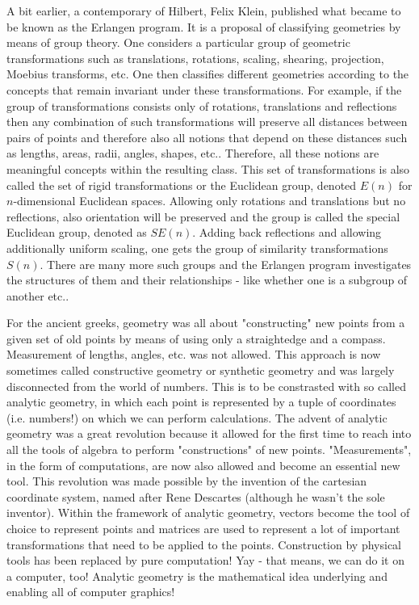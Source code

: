 \medskip
A bit earlier, a contemporary of Hilbert, Felix Klein, published what became to be known as the Erlangen program. It is a proposal of classifying geometries by means of group theory. One considers a particular group of geometric transformations such as translations, rotations, scaling, shearing, projection, Moebius transforms, etc. One then classifies different geometries according to the concepts that remain invariant under these transformations. For example, if the group of transformations consists only of rotations, translations and reflections then any combination of such transformations will preserve all distances between pairs of points and therefore also all notions that depend on these distances such as lengths, areas, radii, angles, shapes, etc.. Therefore, all these notions are meaningful concepts within the resulting class. This set of transformations is also called the set of rigid transformations or the Euclidean group, denoted $E(n)$ for $n$-dimensional Euclidean spaces. Allowing only rotations and translations but no reflections, also orientation will be preserved and the group is called the special Euclidean group, denoted as $SE(n)$. Adding back reflections and allowing additionally uniform scaling, one gets the group of similarity transformations $S(n)$. There are many more such groups and the Erlangen program investigates the structures of them and their relationships - like whether one is a subgroup of another etc..

\medskip
For the ancient greeks, geometry was all about "constructing" new points from a given set of old points by means of using only a straightedge and a compass. Measurement of lengths, angles, etc. was not allowed. This approach is now sometimes called constructive geometry or synthetic geometry and was largely disconnected from the world of numbers. This is to be constrasted with so called analytic geometry, in which each point is represented by a tuple of coordinates (i.e. numbers!) on which we can perform calculations. The advent of analytic geometry was a great revolution because it allowed for the first time to reach into all the tools of algebra to perform "constructions" of new points. "Measurements", in the form of computations, are now also allowed and become an essential new tool. This revolution was made possible by the invention of the cartesian coordinate system, named after Rene Descartes (although he wasn't the sole inventor). Within the framework of analytic geometry, vectors become the tool of choice to represent points and matrices are used to represent a lot of important transformations that need to be applied to the points. Construction by physical tools has been replaced by pure computation! Yay - that means, we can do it on a computer, too! Analytic geometry is the mathematical idea underlying and enabling all of computer graphics!

